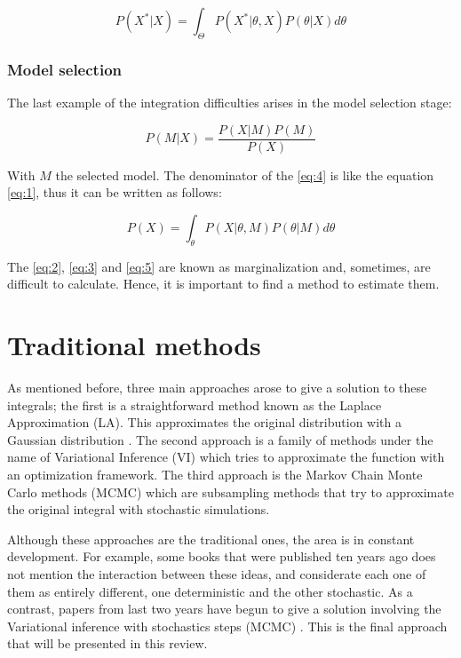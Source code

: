 \documentclass{article}
\begin{document}
\begin{equation}\label{eq:3}
P(X^*|X) = \int_{\Theta} P(X^* | \theta, X) P(\theta | X) d\theta
\end{equation}

\subsubsection{Model selection}

The last example of the integration difficulties arises in the model selection stage:

\begin{equation}\label{eq:4}
P(M | X) = \frac{P(X|M) P(M)}{P(X)}
\end{equation}

With $M$ the selected model. The denominator of the \cref{eq:4} is like the equation \cref{eq:1}, thus it can be written as follows:

\begin{equation}\label{eq:5}
P(X) = \int_{\theta} P(X|\theta, M) P(\theta|M)d \theta
\end{equation}

The \cref{eq:2}, \cref{eq:3} and \cref{eq:5} are known as marginalization and, sometimes, are difficult to calculate. Hence, it is important to find a method to estimate them.


\section{Traditional methods}

As mentioned before, three main approaches arose to give a solution to these integrals; the first is a straightforward method known as the Laplace Approximation (LA). This approximates the original distribution with a Gaussian distribution \cite{buntine1991bayesian}. The second approach is a family of methods under the name of Variational Inference (VI) \cite{bishop2006pattern} which tries to approximate the function with an optimization framework. The third approach is the Markov Chain Monte Carlo methods (MCMC) \cite{bishop2006pattern} which are subsampling methods that try to approximate the original integral with stochastic simulations.

Although these approaches are the traditional ones, the area is in constant development. For example, some books that were published ten years ago \cite{bishop2006pattern} does not mention the interaction between these ideas, and considerate each one of them as entirely different, one deterministic and the other stochastic. As a contrast, papers from last two years have begun to give a solution involving the Variational inference with stochastics steps (MCMC) \cite{salimans2015markov} \cite{gal2016uncertainty}. This is the final approach that will be presented in this review.
\end{document}
